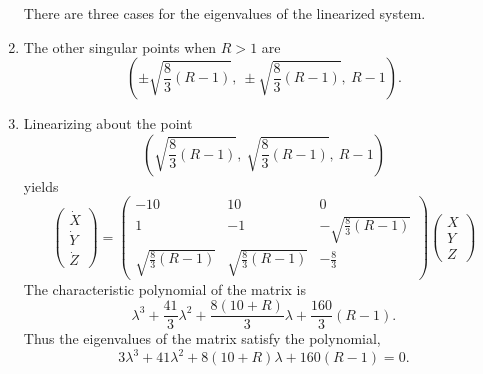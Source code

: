\begin{Solution}
\begin{enumerate}
    There are three cases for the eigenvalues of the linearized system.
  \item
    The other singular points when $R>1$ are
    \[
    \left(\pm\sqrt{\frac{8}{3}(R-1)},\ \pm\sqrt{\frac{8}{3}(R-1)},\ R-1\right).
    \]
  \item
    Linearizing about the point
    \[\left(\sqrt{\frac{8}{3}(R-1)},\ \sqrt{\frac{8}{3}(R-1)},\ R-1\right)\]
    yields
    \[
    \begin{pmatrix}
      \dot{X} \\
      \dot{Y} \\
      \dot{Z}
    \end{pmatrix}
    =
    \begin{pmatrix}
      -10     & 10    & 0     \\
      1       & -1    & -\sqrt{\frac{8}{3}(R-1)} \\
      \sqrt{\frac{8}{3}(R-1)} & \sqrt{\frac{8}{3}(R-1)} & -\frac{8}{3}
    \end{pmatrix}
    \begin{pmatrix}
      X \\
      Y \\
      Z
    \end{pmatrix}
    \]
    The characteristic polynomial of the matrix is
    \[ \lambda^3 + \frac{41}{3} \lambda^2 + \frac{8(10+R)}{3} \lambda
    + \frac{160}{3}(R-1). \]
    Thus the eigenvalues of the matrix satisfy the polynomial,
    \[ 3 \lambda^3 + 41 \lambda^2 + 8(10+R) \lambda + 160(R-1) = 0. \]


\end{enumerate}
\end{Solution}
